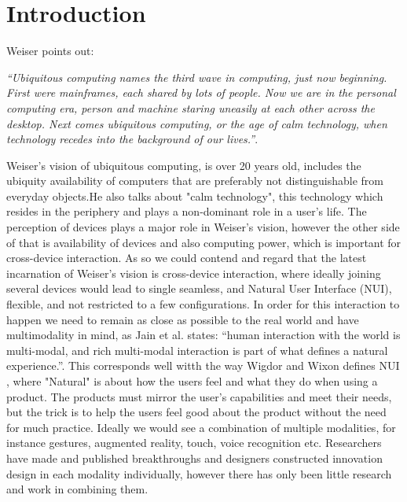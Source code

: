 \section{Introduction}
Weiser\cite{Weiser:1991} points out:
 
{\em``Ubiquitous computing names the third wave in computing, just now beginning. First were mainframes, each shared by lots of people. Now we are in the personal computing era, person and machine staring uneasily at each other across the desktop. Next comes ubiquitous computing, or the age of calm technology, when technology recedes into the background of our lives.''}.

Weiser's vision of ubiquitous computing, is over 20 years old, includes the ubiquity availability of computers that are preferably not distinguishable from everyday objects.He also talks about "calm technology", this technology which resides in the periphery and plays a non-dominant role in a user's life. The perception of devices plays a major role in Weiser's vision, however the other side of that is availability of devices and also computing power, which is important for cross-device interaction. As so we could contend and regard that the latest incarnation of Weiser's vision is cross-device interaction, where ideally joining several devices would lead to single seamless, and Natural User Interface (NUI), flexible, and not restricted to a few configurations\cite{Radle:2015}.
In order for this interaction to happen we need to remain as close as possible to the real world and have multimodality in mind, as Jain et al. states: ``human interaction with the world is multi-modal, and rich multi-modal interaction is part of what defines a natural experience.''\cite{Jain:2011}. 
This corresponds well witth the way Wigdor and Wixon defines NUI , where "Natural" is about how the users feel and what they do when using a product. The products must mirror the user's capabilities and meet their needs, but the trick is to help the users feel good about the product without the need for much practice.\cite{Wigdor:2011}
Ideally we would see a combination of multiple modalities, for instance gestures, augmented reality, touch, voice recognition etc. 
Researchers have made and published breakthroughs and designers constructed innovation design in each modality individually, however there has only been little research and work in combining them.\cite{Jain:2011} \\

